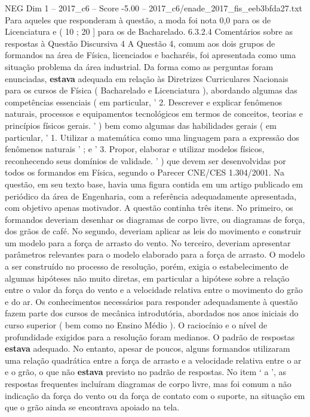 \begin{textsample}{NEG Dim 1 – 2017\_c6 – Score -5.00 – 2017\_c6/enade\_2017\_fis\_eeb3bfda27.txt}
Para aqueles que responderam à questão, a moda foi nota 0,0 para os de Licenciatura e ( 10 ; 20 ] para os de Bacharelado. 6.3.2.4 Comentários sobre as respostas à Questão Discursiva 4 A Questão 4, comum aos dois grupos de formandos na área de Física, licenciados e bacharéis, foi apresentada como uma situação problema da área industrial.
Da forma como as perguntas foram enunciadas, \textbf{estava} adequada em relação às Diretrizes Curriculares Nacionais para os cursos de Física ( Bacharelado e Licenciatura ), abordando algumas das competências essenciais ( em particular, ' 2.
Descrever e explicar fenômenos naturais, processos e equipamentos tecnológicos em termos de conceitos, teorias e princípios físicos gerais. ' ) bem como algumas das habilidades gerais ( em particular, ' 1.
Utilizar a matemática como uma linguagem para a expressão dos fenômenos naturais ' ; e ' 3.
Propor, elaborar e utilizar modelos físicos, reconhecendo seus domínios de validade. ' ) que devem ser desenvolvidas por todos os formandos em Física, segundo o Parecer CNE/CES 1.304/2001.
Na questão, em seu texto base, havia uma figura contida em um artigo publicado em periódico da área de Engenharia, com a referência adequadamente apresentada, com objetivo apenas motivador.
A questão continha três itens.
No primeiro, os formandos deveriam desenhar os diagramas de corpo livre, ou diagramas de força, dos grãos de café.
No segundo, deveriam aplicar as leis do movimento e construir um modelo para a força de arrasto do vento.
No terceiro, deveriam apresentar parâmetros relevantes para o modelo elaborado para a força de arrasto.
O modelo a ser construído no processo de resolução, porém, exigia o estabelecimento de algumas hipóteses não muito diretas, em particular a hipótese sobre a relação entre o valor da força do vento e a velocidade relativa entre o movimento do grão e do ar.
Os conhecimentos necessários para responder adequadamente à questão fazem parte dos cursos de mecânica introdutória, abordados nos anos iniciais do curso superior ( bem como no Ensino Médio ).
O raciocínio e o nível de profundidade exigidos para a resolução foram medianos.
O padrão de respostas \textbf{estava} adequado.
No entanto, apesar de poucos, alguns formandos utilizaram uma relação quadrática entre a força de arrasto e a velocidade relativa entre o ar e o grão, o que não \textbf{estava} previsto no padrão de respostas.
No item ‘ a ’, as respostas frequentes incluíram diagramas de corpo livre, mas foi comum a não indicação da força do vento ou da força de contato com o suporte, na situação em que o grão ainda se encontrava apoiado na tela.

\end{textsample}
